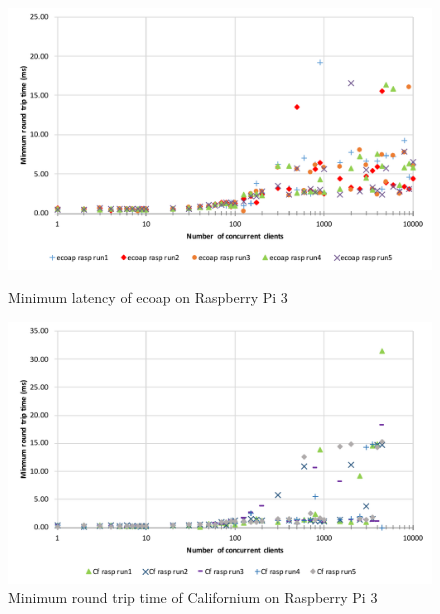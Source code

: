 \begin{figure}[!htbp]
\centering
\includegraphics[scale = 0.7]{ecoap_min_latency_rasp}
\caption{Minimum latency of ecoap on Raspberry Pi 3}
\label{fig:ecoap_min_latency_rasp}
\includegraphics[scale = 0.7]{californium_min_latency_rasp}
\caption{Minimum round trip time of Californium on Raspberry Pi 3}
\label{fig:californium_min_latency_rasp}
\end{figure}

